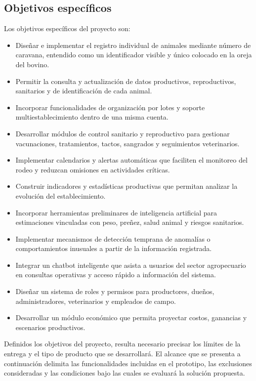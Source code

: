 \subsection{Objetivos espec\'ificos}

Los objetivos espec\'ificos del proyecto son:

\begin{itemize}
    \item Dise\~nar e implementar el registro individual de animales mediante n\'umero de caravana, entendido como un identificador visible y \'unico colocado en la oreja del bovino.
    \item Permitir la consulta y actualizaci\'on de datos productivos, reproductivos, sanitarios y de identificaci\'on de cada animal.
    \item Incorporar funcionalidades de organizaci\'on por lotes y soporte multiestablecimiento dentro de una misma cuenta.
    \item Desarrollar m\'odulos de control sanitario y reproductivo para gestionar vacunaciones, tratamientos, tactos, sangrados y seguimientos veterinarios.
    \item Implementar calendarios y alertas autom\'aticas que faciliten el monitoreo del rodeo y reduzcan omisiones en actividades cr\'iticas.
    \item Construir indicadores y estad\'isticas productivas que permitan analizar la evoluci\'on del establecimiento.
    \item Incorporar herramientas preliminares de inteligencia artificial para estimaciones vinculadas con peso, pre\~nez, salud animal y riesgos sanitarios.
    \item Implementar mecanismos de detecci\'on temprana de anomal\'ias o comportamientos inusuales a partir de la informaci\'on registrada.
    \item Integrar un chatbot inteligente que asista a usuarios del sector agropecuario en consultas operativas y acceso r\'apido a informaci\'on del sistema.
    \item Dise\~nar un sistema de roles y permisos para productores, due\~nos, administradores, veterinarios y empleados de campo.
    \item Desarrollar un m\'odulo econ\'omico que permita proyectar costos, ganancias y escenarios productivos.
\end{itemize}

Definidos los objetivos del proyecto, resulta necesario precisar los l\'imites de la entrega y el tipo de producto que se desarrollar\'a. El alcance que se presenta a continuaci\'on delimita las funcionalidades incluidas en el prototipo, las exclusiones consideradas y las condiciones bajo las cuales se evaluar\'a la soluci\'on propuesta.

